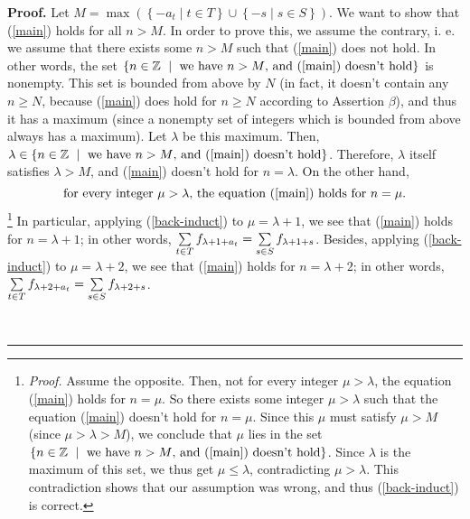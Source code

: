 \documentclass[numbers=enddot,12pt,final,onecolumn,notitlepage]{scrartcl}%
\numberwithin{exer}{section}
\theoremstyle{definition}
\newenvironment{proof}[1][Proof]{\noindent\textbf{#1.} }{\ \rule{0.5em}{0.5em}}
\let\sumnonlimits\sum
\renewcommand{\sum}{\sumnonlimits\limits}
\begin{document}
\begin{proof}
Let $M=\max\left(  \left\{  -a_{t}\mid t\in T\right\}  \cup\left\{  -s\mid
s\in S\right\}  \right)  $. We want to show that (\ref{main}) holds for all
$n>M$. In order to prove this, we assume the contrary, i. e. we assume that
there exists some $n>M$ such that (\ref{main}) does not hold. In other words,
the set $\left\{  n\in\mathbb{Z}\ \mid\ \text{we have }n>M\text{, and
(\ref{main}) doesn't hold}\right\}  $ is nonempty. This set is bounded from
above by $N$ (in fact, it doesn't contain any $n\geq N$, because (\ref{main})
does hold for $n\geq N$ according to Assertion $\beta$), and thus it has a
maximum (since a nonempty set of integers which is bounded from above always
has a maximum). Let $\lambda$ be this maximum. Then, $\lambda\in\left\{
n\in\mathbb{Z}\ \mid\ \text{we have }n>M\text{, and (\ref{main}) doesn't
hold}\right\}  $. Therefore, $\lambda$ itself satisfies $\lambda>M$, and
(\ref{main}) doesn't hold for $n=\lambda$. On the other hand,%
\begin{equation}
\text{for every integer }\mu>\lambda\text{, the equation (\ref{main}) holds
for }n=\mu. \label{back-induct}%
\end{equation}
\footnote{\textit{Proof.} Assume the opposite. Then, not for every integer
$\mu>\lambda$, the equation (\ref{main}) holds for $n=\mu$. So there exists
some integer $\mu>\lambda$ such that the equation (\ref{main}) doesn't hold
for $n=\mu$. Since this $\mu$ must satisfy $\mu>M$ (since $\mu>\lambda>M$), we
conclude that $\mu$ lies in the set $\left\{  n\in\mathbb{Z}\ \mid\ \text{we
have }n>M\text{, and (\ref{main}) doesn't hold}\right\}  $. Since $\lambda$ is
the maximum of this set, we thus get $\mu\leq\lambda$, contradicting
$\mu>\lambda$. This contradiction shows that our assumption was wrong, and
thus (\ref{back-induct}) is correct.} In particular, applying
(\ref{back-induct}) to $\mu=\lambda+1$, we see that (\ref{main}) holds for
$n=\lambda+1$; in other words, $\sum\limits_{t\in T}f_{\lambda+1+a_{t}}%
=\sum\limits_{s\in S}f_{\lambda+1+s}$. Besides, applying (\ref{back-induct})
to $\mu=\lambda+2$, we see that (\ref{main}) holds for $n=\lambda+2$; in other
words, $\sum\limits_{t\in T}f_{\lambda+2+a_{t}}=\sum\limits_{s\in S}%
f_{\lambda+2+s}$.


\end{proof}
\end{document}
